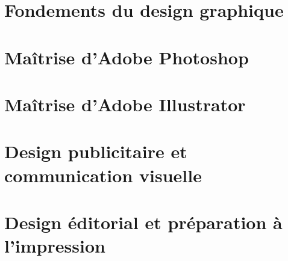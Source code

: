 \documentclass[11pt,a4paper,oneside]{book}
\begin{document}
\part{Fondements du design graphique}







\part{Maîtrise d'Adobe Photoshop}









\part{Maîtrise d'Adobe Illustrator}









\part{Design publicitaire et communication visuelle}






\part{Design éditorial et préparation à l'impression}

% 
% 
\end{document}
